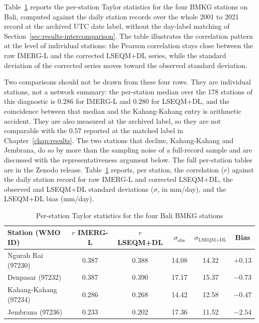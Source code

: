 Table~\ref{tab:perstation-bali} reports the per-station Taylor
statistics for the four BMKG stations on Bali, computed against
the daily station records over the whole 2001 to 2021 record at
the archived UTC date label, without the day-label matching of
Section~\ref{sec:results-intercomparison}. The table illustrates
the correlation pattern at the level of individual stations: the
Pearson correlation stays close between the raw IMERG-L and the
corrected LSEQM+DL series, while the standard deviation of the
corrected series moves toward the observed standard deviation.

Two comparisons should not be drawn from these four rows. They are
individual stations, not a network summary: the per-station median
over the 178 stations of this diagnostic is $0.286$ for IMERG-L and
$0.280$ for LSEQM+DL, and the coincidence between that median and
the Kahang-Kahang entry is arithmetic accident. They are also
measured at the archived label, so they are not comparable with the
$0.57$ reported at the matched label in
Chapter~\ref{chap:results}. The two stations that decline,
Kahang-Kahang and Jembrana, do so by more than the sampling noise
of a full-record sample and are discussed with the
representativeness argument below. The full per-station tables are
in the Zenodo release.
Table~\ref{tab:perstation-bali} reports, per station, the correlation
($r$) against the daily station record for raw IMERG-L and corrected
LSEQM+DL, the observed and LSEQM+DL standard deviations ($\sigma$, in
mm/day), and the LSEQM+DL bias (mm/day).

\begin{table}[H]
\centering
\caption{Per-station Taylor statistics for the four Bali BMKG stations\label{tab:perstation-bali}}
\begingroup\small
\begin{tabular}{@{}lccccc@{}}
\toprule
Station (WMO ID) & $r$ IMERG-L & $r$ LSEQM+DL & $\sigma_{\text{obs}}$ & $\sigma_{\text{LSEQM+DL}}$ & Bias \\
\midrule
Ngurah Rai (97230)   & 0.387 & 0.388 & 14.08 & 14.32 & $+0.13$ \\
Denpasar (97232)     & 0.387 & 0.390 & 17.17 & 15.37 & $-0.73$ \\
Kahang-Kahang (97234)& 0.286 & 0.268 & 14.42 & 12.58 & $-0.47$ \\
Jembrana (97236)     & 0.233 & 0.202 & 17.36 & 11.52 & $-2.54$ \\
\bottomrule
\end{tabular}
\endgroup
\end{table}

